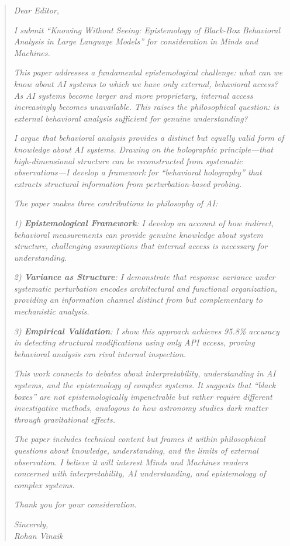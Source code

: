 \documentclass[12pt]{article}
\begin{document}
\begin{quote}
\textit{Dear Editor,}

\textit{I submit ``Knowing Without Seeing: Epistemology of Black-Box Behavioral Analysis in Large Language Models'' for consideration in Minds and Machines.}

\textit{This paper addresses a fundamental epistemological challenge: what can we know about AI systems to which we have only external, behavioral access? As AI systems become larger and more proprietary, internal access increasingly becomes unavailable. This raises the philosophical question: is external behavioral analysis sufficient for genuine understanding?}

\textit{I argue that behavioral analysis provides a distinct but equally valid form of knowledge about AI systems. Drawing on the holographic principle—that high-dimensional structure can be reconstructed from systematic observations—I develop a framework for ``behavioral holography'' that extracts structural information from perturbation-based probing.}

\textit{The paper makes three contributions to philosophy of AI:}

\textit{1) \textbf{Epistemological Framework}: I develop an account of how indirect, behavioral measurements can provide genuine knowledge about system structure, challenging assumptions that internal access is necessary for understanding.}

\textit{2) \textbf{Variance as Structure}: I demonstrate that response variance under systematic perturbation encodes architectural and functional organization, providing an information channel distinct from but complementary to mechanistic analysis.}

\textit{3) \textbf{Empirical Validation}: I show this approach achieves 95.8\% accuracy in detecting structural modifications using only API access, proving behavioral analysis can rival internal inspection.}

\textit{This work connects to debates about interpretability, understanding in AI systems, and the epistemology of complex systems. It suggests that ``black boxes'' are not epistemologically impenetrable but rather require different investigative methods, analogous to how astronomy studies dark matter through gravitational effects.}

\textit{The paper includes technical content but frames it within philosophical questions about knowledge, understanding, and the limits of external observation. I believe it will interest Minds and Machines readers concerned with interpretability, AI understanding, and epistemology of complex systems.}

\textit{Thank you for your consideration.}

\textit{Sincerely,}\\
\textit{Rohan Vinaik}
\end{quote}
\end{document}

